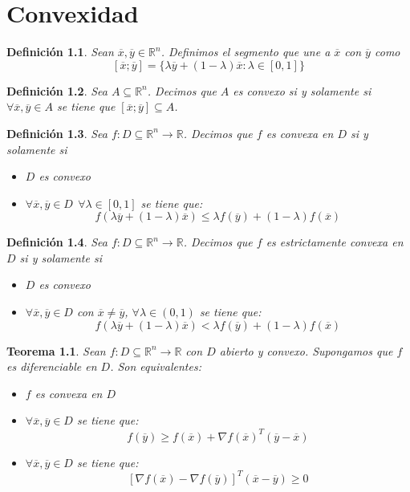 \documentclass[11pt]{report}
\newtheorem{definition}{Definición}[section]
\newtheorem{theorem}{Teorema}[section]
\newcommand{\Rn}{\mathbb{R}^{n}}
\newcommand{\R}{\mathbb{R}}
\newcommand{\x}{\overline{x}}
\newcommand{\y}{\overline{y}}
\begin{document}
\chapter{Convexidad}
\begin{definition}
Sean $\x,\y\in\Rn$. Definimos el segmento que une a $\x$ con $\y$ como
$$[\x;\y] = \{\lambda\y + (1-\lambda)\x: \lambda\in [0,1]\}$$
\end{definition}

\begin{definition}
Sea $A\subseteq \mathbb{R}^{n}$. Decimos que $A$ es convexo si y solamente si $\forall\overline{x}, \overline{y}\in A$ se tiene que $[\overline{x}; \overline{y}]\subseteq A$.
\end{definition}

\begin{definition}
Sea $f:D\subseteq\Rn\rightarrow\R$. Decimos que $f$ es convexa en $D$ si y solamente si
\begin{itemize}
\item[(i)] $D$ es convexo
\item[(ii)] $\forall\x,\y\in D\ \ \forall\lambda\in [0, 1]$ se tiene que: $$f(\lambda\y+(1-\lambda)\x)\leq\lambda f(\y)+(1-\lambda)f(\x)$$
\end{itemize}
\end{definition}

\begin{definition}
Sea $f:D\subseteq\Rn\rightarrow\R$. Decimos que $f$ es estrictamente convexa en $D$ si y solamente si
\begin{itemize}
\item[(i)] $D$ es convexo
\item[(ii)] $\forall\x,\y\in D$ con $\x\ne\y$, $\forall\lambda\in (0, 1)$ se tiene que: $$f(\lambda\y+(1-\lambda)\x)<\lambda f(\y)+(1-\lambda)f(\x)$$
\end{itemize}
\end{definition}

\begin{theorem}
Sean $f:D\subseteq\Rn\rightarrow\R$ con $D$ abierto y convexo. Supongamos que $f$ es diferenciable en $D$. Son equivalentes:
\begin{itemize}
\item[(i)] $f$ es convexa en $D$
\item[(ii)] $\forall\x,\y\in D$ se tiene que: $$f(\y)\geq f(\x)+\nabla f(\x)^{T}(\y - \x)$$
\item[(iii)] $\forall\x,\y\in D$ se tiene que: $$[\nabla f(\x)-\nabla f(\y)]^{T}(\x-\y)\geq0$$
\end{itemize}
\end{theorem}
\end{document}
